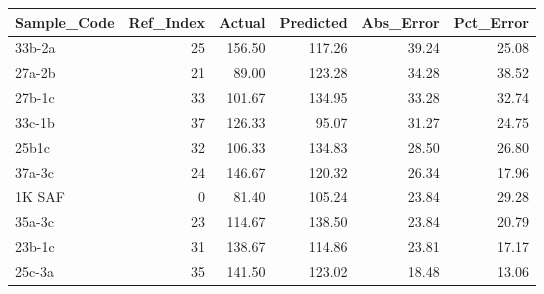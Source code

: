 \begin{tabular}{lrrrrr}
\toprule
Sample_Code & Ref_Index & Actual & Predicted & Abs_Error & Pct_Error \\
\midrule
33b-2a & 25 & 156.50 & 117.26 & 39.24 & 25.08 \\
27a-2b & 21 & 89.00 & 123.28 & 34.28 & 38.52 \\
27b-1c & 33 & 101.67 & 134.95 & 33.28 & 32.74 \\
33c-1b & 37 & 126.33 & 95.07 & 31.27 & 24.75 \\
25b1c & 32 & 106.33 & 134.83 & 28.50 & 26.80 \\
37a-3c & 24 & 146.67 & 120.32 & 26.34 & 17.96 \\
1K SAF & 0 & 81.40 & 105.24 & 23.84 & 29.28 \\
35a-3c & 23 & 114.67 & 138.50 & 23.84 & 20.79 \\
23b-1c & 31 & 138.67 & 114.86 & 23.81 & 17.17 \\
25c-3a & 35 & 141.50 & 123.02 & 18.48 & 13.06 \\
\bottomrule
\end{tabular}
